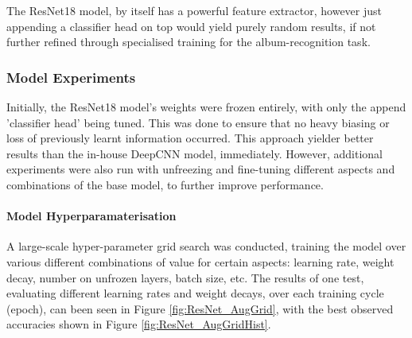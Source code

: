                 The ResNet18 model, by itself has a powerful feature extractor, however just appending a classifier head on top would yield purely random results, if not further refined through specialised training for the album-recognition task.
    
                \subsubsection{Model Experiments}
    
                    Initially, the ResNet18 model's weights were frozen entirely, with only the append 'classifier head' being tuned. This was done to ensure that no heavy biasing or loss of previously learnt information occurred. This approach yielder better results than the in-house DeepCNN model, immediately. However, additional experiments were also run with unfreezing and fine-tuning different aspects and combinations of the base model, to further improve performance.
        
                    \paragraph{Model Hyperparamaterisation}
        
                        A large-scale hyper-parameter grid search was conducted, training the model over various different combinations of value for certain aspects: learning rate, weight decay, number on unfrozen layers, batch size, etc. The results of one test, evaluating different learning rates and weight decays, over each training cycle (epoch), can been seen in Figure \ref{fig:ResNet_AugGrid}, with the best observed accuracies shown in Figure \ref{fig:ResNet_AugGridHist}.
                
